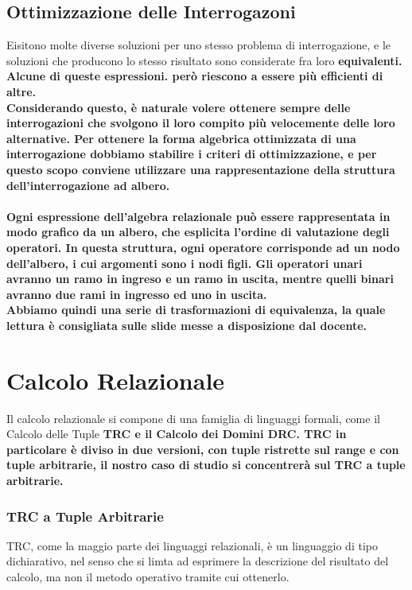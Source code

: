 \documentclass[11pt]{article} %
\begin{document}
\subsection{Ottimizzazione delle Interrogazoni}
Eisitono molte diverse soluzioni per uno stesso problema di interrogazione, e le soluzioni che producono lo stesso risultato sono considerate fra loro \bf equivalenti\rm. Alcune di queste espressioni. però riescono a essere più efficienti di altre.\\
Considerando questo, è naturale volere ottenere sempre delle interrogazioni che svolgono il loro compito più velocemente delle loro alternative. Per ottenere la forma algebrica ottimizzata di una interrogazione dobbiamo stabilire i criteri di ottimizzazione, e per questo scopo conviene utilizzare una rappresentazione della struttura dell'interrogazione \bf ad albero\rm. \\ \\
Ogni espressione dell'algebra relazionale può essere rappresentata in modo grafico da un albero, che esplicita l'ordine di valutazione degli operatori. In questa struttura, ogni operatore corrisponde ad un nodo dell'albero, i cui argomenti sono i nodi figli. Gli operatori unari avranno un ramo in ingreso e un ramo in uscita, mentre quelli binari avranno due rami in ingresso ed uno in uscita.\\
Abbiamo quindi una serie di \bf trasformazioni di equivalenza\rm, la quale lettura è consigliata sulle slide messe a disposizione dal docente.
\newpage
\section{Calcolo Relazionale}
Il calcolo relazionale si compone di una famiglia di linguaggi formali, come il Calcolo delle Tuple \bf TRC \rm e il Calcolo dei Domini \bf DRC\rm. TRC in particolare è diviso in due versioni, con tuple ristrette sul range e con tuple arbitrarie, il nostro caso di studio si concentrerà sul TRC a tuple arbitrarie.
\subsubsection{TRC a Tuple Arbitrarie}
TRC, come la maggio parte dei linguaggi relazionali, è un linguaggio di tipo dichiarativo, nel senso che si limta ad esprimere la descrizione del risultato del calcolo, ma non il metodo operativo tramite cui ottenerlo.
\end{document}
